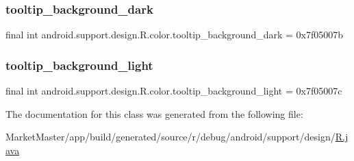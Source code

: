 \subsubsection{\texorpdfstring{tooltip\+\_\+background\+\_\+dark}{tooltip\_background\_dark}}
{\footnotesize\ttfamily final int android.\+support.\+design.\+R.\+color.\+tooltip\+\_\+background\+\_\+dark = 0x7f05007b\hspace{0.3cm}{\ttfamily [static]}}

\mbox{\label{classandroid_1_1support_1_1design_1_1R_1_1color_a0e4046f4766953991a1ac2f63727d588}} 
\subsubsection{\texorpdfstring{tooltip\+\_\+background\+\_\+light}{tooltip\_background\_light}}
{\footnotesize\ttfamily final int android.\+support.\+design.\+R.\+color.\+tooltip\+\_\+background\+\_\+light = 0x7f05007c\hspace{0.3cm}{\ttfamily [static]}}



The documentation for this class was generated from the following file\+:\begin{DoxyCompactItemize}
\item 
Market\+Master/app/build/generated/source/r/debug/android/support/design/\mbox{\hyperlink{debug_2android_2support_2design_2R_8java}{R.\+java}}\end{DoxyCompactItemize}
